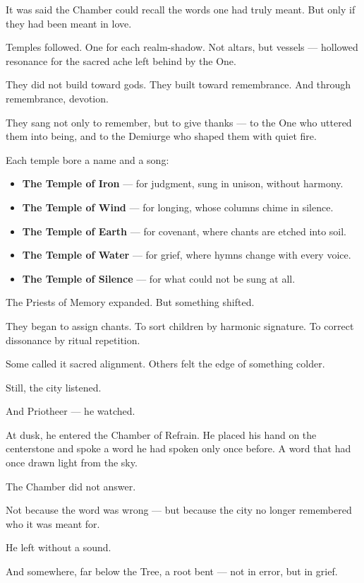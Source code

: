 \documentclass[12pt]{article}
\begin{document}
It was said the Chamber could recall the words one had truly meant.  
But only if they had been meant in love.

Temples followed.  
One for each realm-shadow.  
Not altars, but vessels —  
hollowed resonance for the sacred ache left behind by the One.

They did not build toward gods.  
They built toward remembrance.  
And through remembrance, devotion.

They sang not only to remember,  
but to give thanks —  
to the One who uttered them into being,  
and to the Demiurge who shaped them with quiet fire.

Each temple bore a name and a song:

\begin{itemize}
\item \textbf{The Temple of Iron} — for judgment, sung in unison, without harmony.
\item \textbf{The Temple of Wind} — for longing, whose columns chime in silence.
\item \textbf{The Temple of Earth} — for covenant, where chants are etched into soil.
\item \textbf{The Temple of Water} — for grief, where hymns change with every voice.
\item \textbf{The Temple of Silence} — for what could not be sung at all.
\end{itemize}

The Priests of Memory expanded.  
But something shifted.

They began to assign chants.  
To sort children by harmonic signature.  
To correct dissonance by ritual repetition.

Some called it sacred alignment.  
Others felt the edge of something colder.

Still, the city listened.

And Priotheer —  
he watched.

At dusk, he entered the Chamber of Refrain.  
He placed his hand on the centerstone and spoke a word he had spoken only once before.  
A word that had once drawn light from the sky.

The Chamber did not answer.

Not because the word was wrong —  
but because the city no longer remembered who it was meant for.

He left without a sound.

And somewhere, far below the Tree,  
a root bent — not in error,  
but in grief.
\end{document}
